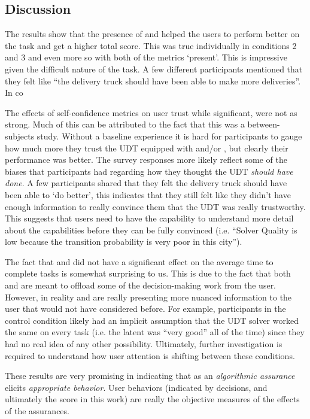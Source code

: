 \subsection{Discussion}
The results show that the presence of \xQ{} and \xO{} helped the users to perform better on the task and get a higher total score. This was true individually in conditions 2 and 3 and even more so with both of the metrics `present'. This is impressive given the difficult nature of the task. A few different participants mentioned that they felt like ``the delivery truck should have been able to make more deliveries''. In co

The effects of self-confidence metrics on user trust while significant, were not as strong. Much of this can be attributed to the fact that this was a between-subjects study. Without a baseline experience it is hard for participants to gauge how much more they trust the UDT equipped with \xQ{} and/or \xO, but clearly their performance was better. The survey responses more likely reflect some of the biases that participants had regarding how they thought the UDT \emph{should have done}. A few participants shared that they felt the delivery truck should have been able to `do better', this indicates that they still felt like they didn't have enough information to really convince them that the UDT was really trustworthy. This suggests that users need to have the capability to understand more detail about the capabilities before they can be fully convinced (i.e. ``Solver Quality is low because the transition probability is very poor in this city'').

The fact that \xQ{} and \xO{} did not have a significant effect on the average time to complete tasks is somewhat surprising to us. This is due to the fact that both \xQ{} and \xO{} are meant to offload some of the decision-making work from the user. However, in reality \xQ{} and \xO{} are really presenting more nuanced information to the user that would not have considered before. For example, participants in the control condition likely had an implicit assumption that the UDT solver worked the same on every task (i.e. the latent \xQ{} was ``very good'' all of the time) since they had no real idea of any other possibility. Ultimately, further investigation is required to understand how user attention is shifting between these conditions.

These results are very promising in indicating that \famsec{} as an \emph{algorithmic assurance} elicits \emph{appropriate behavior}. User behaviors (indicated by decisions, and ultimately the score in this work) are really the objective measures of the effects of the assurances.

